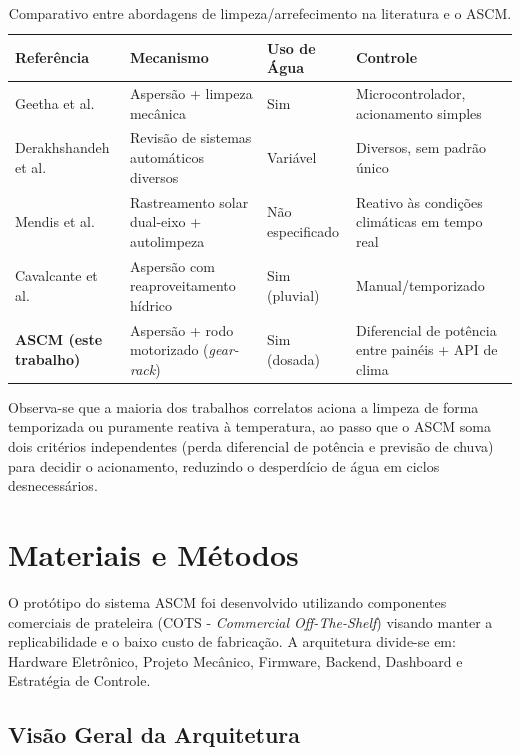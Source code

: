 \documentclass[12pt, a4paper]{article}
\begin{document}
\begin{table}[htbp]
    \centering
    \caption{Comparativo entre abordagens de limpeza/arrefecimento na literatura e o ASCM.}
    \label{tab:trabalhos_correlatos}
    \begin{tabular}{p{2.6cm}p{3.6cm}p{2.2cm}p{4.4cm}}
    \toprule
    \textbf{Referência} & \textbf{Mecanismo} & \textbf{Uso de Água} & \textbf{Controle} \\
    \midrule
    Geetha et al. \cite{geetha2024} & Aspersão + limpeza mecânica & Sim & Microcontrolador, acionamento simples \\
    Derakhshandeh et al. \cite{derakhshandeh2021} & Revisão de sistemas automáticos diversos & Variável & Diversos, sem padrão único \\
    Mendis et al. \cite{mendis2026} & Rastreamento solar dual-eixo + autolimpeza & Não especificado & Reativo às condições climáticas em tempo real \\
    Cavalcante et al. \cite{cavalcante2016} & Aspersão com reaproveitamento hídrico & Sim (pluvial) & Manual/temporizado \\
    \textbf{ASCM (este trabalho)} & Aspersão + rodo motorizado (\textit{gear-rack}) & Sim (dosada) & Diferencial de potência entre painéis + API de clima \\
    \bottomrule
    \end{tabular}
\end{table}

Observa-se que a maioria dos trabalhos correlatos aciona a limpeza de forma temporizada ou puramente reativa à temperatura, ao passo que o ASCM soma dois critérios independentes (perda diferencial de potência e previsão de chuva) para decidir o acionamento, reduzindo o desperdício de água em ciclos desnecessários.

\section{Materiais e Métodos}
\label{sec:metodologia}

O protótipo do sistema ASCM foi desenvolvido utilizando componentes comerciais de prateleira (COTS - \textit{Commercial Off-The-Shelf}) visando manter a replicabilidade e o baixo custo de fabricação. A arquitetura divide-se em: Hardware Eletrônico, Projeto Mecânico, Firmware, Backend, Dashboard e Estratégia de Controle.

\subsection{Visão Geral da Arquitetura}
\end{document}
